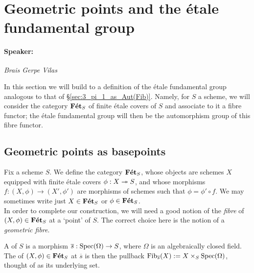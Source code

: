\section{Geometric points and the \'etale fundamental group}
\label{sec:4_efg}

\paragraph{Speaker:} \emph{Brais Gerpe Vilas}


In this section we will build to a definition of the \'etale fundamental group analogous to that of \S\ref{sec:3_pi_1_as_Aut(Fib)}. Namely, for $S$ a scheme, we will consider the category $\mathbf{F\acute{e}t}_S$ of finite \'etale covers of $S$ and associate to it a fibre functor; the \'etale fundamental group will then be the automorphism group of this fibre functor.


\subsection{Geometric points as basepoints}
\label{subsec:4_1_Fet_S}
Fix a scheme $S$. We define the category $\mathbf{F\acute{e}t}_S$, whose objects are schemes $X$ equipped with finite \'etale covers $\phi : X \twoheadrightarrow S$, and whose morphisms $f : (X, \phi) \to (X', \phi')$ are morphisms of schemes such that $\phi = \phi' \circ f$. We may sometimes write just $X \in \mathbf{F\acute{e}t}_S$ or $\phi \in \mathbf{F\acute{e}t}_S$.\\ 

In order to complete our construction, we will need a good notion of the \emph{fibre} of $(X, \phi) \in \mathbf{F\acute{e}t}_S$ at a `point' of $S$. The correct choice here is the notion of a \emph{geometric fibre}.

\begin{defn}
	A  of $S$ is a morphism $\overline{s} : \mathrm{Spec}(\Omega) \to S$, where $\Omega$ is an algebraically closed field. The  of $(X, \phi) \in \mathbf{F\acute{e}t}_S$ at $\overline{s}$ is then the pullback $\mathrm{Fib}_{\overline{s}}(X) := X \times_S \mathrm{Spec}(\Omega)$, thought of as its underlying set.
\end{defn}

